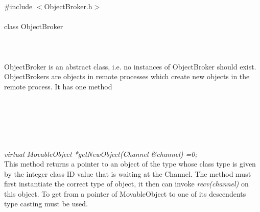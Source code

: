 
 \\

   \\
\indent \#include $<$ObjectBroker.h$>$  \\

  \\
\indent class ObjectBroker \\

 \\
 \\

  \\
\indent ObjectBroker is an abstract class, i.e. no instances of ObjectBroker
should exist. ObjectBrokers are objects in remote processes which
create new objects in the remote process. It has one method

  \\
  \\

 \\
\\ 

  \\
{\em virtual MovableObject *getNewObject(Channel \&channel) =0;} \\
This method returns a pointer to an object of the type whose class
type is given by the integer class ID value that is waiting at the Channel.
The method must first instantiate the correct type of object, it then
can invoke {\em recv(channel)} on this object. To get from a pointer
of MovableObject to one of its descendents type casting must be
used. \\ 

  \\
